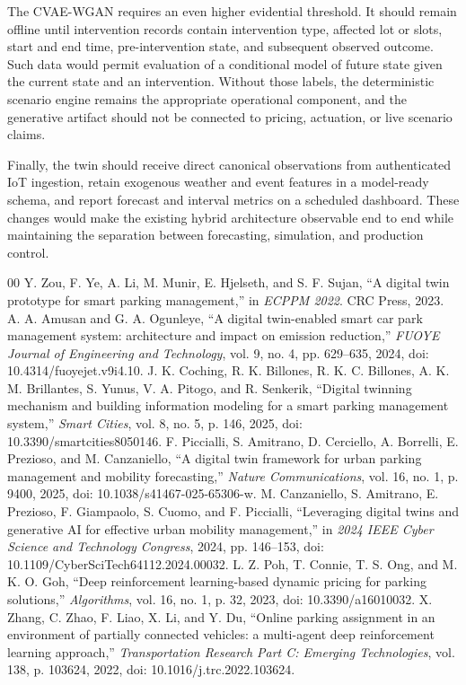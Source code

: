 \documentclass[conference]{IEEEtran}
\begin{document}
The CVAE-WGAN requires an even higher evidential threshold. It should remain offline until intervention records contain intervention type, affected lot or slots, start and end time, pre-intervention state, and subsequent observed outcome. Such data would permit evaluation of a conditional model of future state given the current state and an intervention. Without those labels, the deterministic scenario engine remains the appropriate operational component, and the generative artifact should not be connected to pricing, actuation, or live scenario claims.

Finally, the twin should receive direct canonical observations from authenticated IoT ingestion, retain exogenous weather and event features in a model-ready schema, and report forecast and interval metrics on a scheduled dashboard. These changes would make the existing hybrid architecture observable end to end while maintaining the separation between forecasting, simulation, and production control.


\begin{thebibliography}{00}
 Y. Zou, F. Ye, A. Li, M. Munir, E. Hjelseth, and S. F. Sujan, ``A digital twin prototype for smart parking management,'' in \textit{ECPPM 2022}. CRC Press, 2023.
 A. A. Amusan and G. A. Ogunleye, ``A digital twin-enabled smart car park management system: architecture and impact on emission reduction,'' \textit{FUOYE Journal of Engineering and Technology}, vol. 9, no. 4, pp. 629--635, 2024, doi: 10.4314/fuoyejet.v9i4.10.
 J. K. Coching, R. K. Billones, R. K. C. Billones, A. K. M. Brillantes, S. Yunus, V. A. Pitogo, and R. Senkerik, ``Digital twinning mechanism and building information modeling for a smart parking management system,'' \textit{Smart Cities}, vol. 8, no. 5, p. 146, 2025, doi: 10.3390/smartcities8050146.
 F. Piccialli, S. Amitrano, D. Cerciello, A. Borrelli, E. Prezioso, and M. Canzaniello, ``A digital twin framework for urban parking management and mobility forecasting,'' \textit{Nature Communications}, vol. 16, no. 1, p. 9400, 2025, doi: 10.1038/s41467-025-65306-w.
 M. Canzaniello, S. Amitrano, E. Prezioso, F. Giampaolo, S. Cuomo, and F. Piccialli, ``Leveraging digital twins and generative AI for effective urban mobility management,'' in \textit{2024 IEEE Cyber Science and Technology Congress}, 2024, pp. 146--153, doi: 10.1109/CyberSciTech64112.2024.00032.
 L. Z. Poh, T. Connie, T. S. Ong, and M. K. O. Goh, ``Deep reinforcement learning-based dynamic pricing for parking solutions,'' \textit{Algorithms}, vol. 16, no. 1, p. 32, 2023, doi: 10.3390/a16010032.
 X. Zhang, C. Zhao, F. Liao, X. Li, and Y. Du, ``Online parking assignment in an environment of partially connected vehicles: a multi-agent deep reinforcement learning approach,'' \textit{Transportation Research Part C: Emerging Technologies}, vol. 138, p. 103624, 2022, doi: 10.1016/j.trc.2022.103624.
\end{thebibliography}
\end{document}
